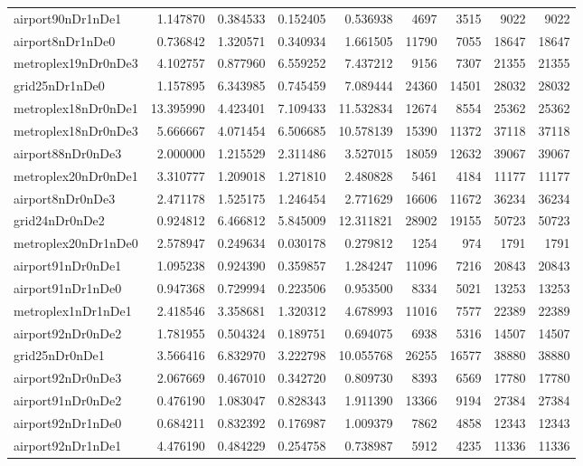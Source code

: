 \begin{longtable}{|l|r|r|r|r|r|r|r|r|}
airport90nDr1nDe1 & 1.147870 & 0.384533 & 0.152405 & 0.536938 & 4697 & 3515 & 9022 & 9022 \\
airport8nDr1nDe0 & 0.736842 & 1.320571 & 0.340934 & 1.661505 & 11790 & 7055 & 18647 & 18647 \\
metroplex19nDr0nDe3 & 4.102757 & 0.877960 & 6.559252 & 7.437212 & 9156 & 7307 & 21355 & 21355 \\
grid25nDr1nDe0 & 1.157895 & 6.343985 & 0.745459 & 7.089444 & 24360 & 14501 & 28032 & 28032 \\
metroplex18nDr0nDe1 & 13.395990 & 4.423401 & 7.109433 & 11.532834 & 12674 & 8554 & 25362 & 25362 \\
metroplex18nDr0nDe3 & 5.666667 & 4.071454 & 6.506685 & 10.578139 & 15390 & 11372 & 37118 & 37118 \\
airport88nDr0nDe3 & 2.000000 & 1.215529 & 2.311486 & 3.527015 & 18059 & 12632 & 39067 & 39067 \\
metroplex20nDr0nDe1 & 3.310777 & 1.209018 & 1.271810 & 2.480828 & 5461 & 4184 & 11177 & 11177 \\
airport8nDr0nDe3 & 2.471178 & 1.525175 & 1.246454 & 2.771629 & 16606 & 11672 & 36234 & 36234 \\
grid24nDr0nDe2 & 0.924812 & 6.466812 & 5.845009 & 12.311821 & 28902 & 19155 & 50723 & 50723 \\
metroplex20nDr1nDe0 & 2.578947 & 0.249634 & 0.030178 & 0.279812 & 1254 & 974 & 1791 & 1791 \\
airport91nDr0nDe1 & 1.095238 & 0.924390 & 0.359857 & 1.284247 & 11096 & 7216 & 20843 & 20843 \\
airport91nDr1nDe0 & 0.947368 & 0.729994 & 0.223506 & 0.953500 & 8334 & 5021 & 13253 & 13253 \\
metroplex1nDr1nDe1 & 2.418546 & 3.358681 & 1.320312 & 4.678993 & 11016 & 7577 & 22389 & 22389 \\
airport92nDr0nDe2 & 1.781955 & 0.504324 & 0.189751 & 0.694075 & 6938 & 5316 & 14507 & 14507 \\
grid25nDr0nDe1 & 3.566416 & 6.832970 & 3.222798 & 10.055768 & 26255 & 16577 & 38880 & 38880 \\
airport92nDr0nDe3 & 2.067669 & 0.467010 & 0.342720 & 0.809730 & 8393 & 6569 & 17780 & 17780 \\
airport91nDr0nDe2 & 0.476190 & 1.083047 & 0.828343 & 1.911390 & 13366 & 9194 & 27384 & 27384 \\
airport92nDr1nDe0 & 0.684211 & 0.832392 & 0.176987 & 1.009379 & 7862 & 4858 & 12343 & 12343 \\
airport92nDr1nDe1 & 4.476190 & 0.484229 & 0.254758 & 0.738987 & 5912 & 4235 & 11336 & 11336 \\

\end{longtable}
